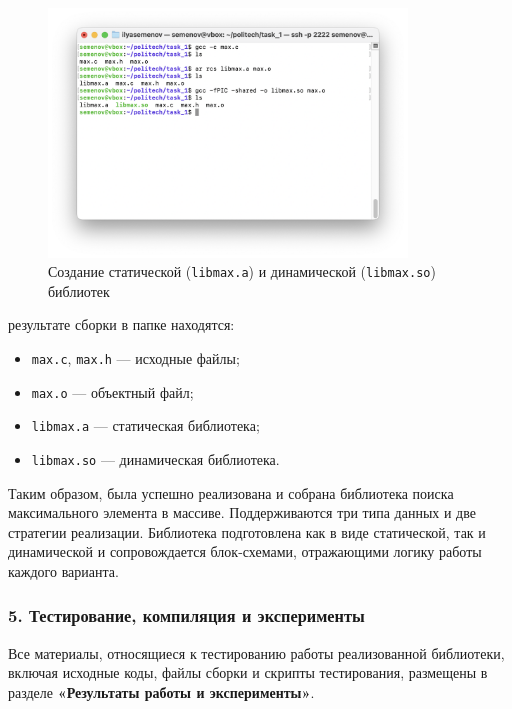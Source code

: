 \begin{figure}[H]
\centering
\includegraphics[width=0.85\textwidth]{img/Screenshot_2025-06-20_at_01.10.14.png}
\caption{Создание статической (\texttt{libmax.a}) и динамической (\texttt{libmax.so}) библиотек}
\end{figure}

 результате сборки в папке находятся:
\begin{itemize}[noitemsep]
  \item \texttt{max.c}, \texttt{max.h} — исходные файлы;
  \item \texttt{max.o} — объектный файл;
  \item \texttt{libmax.a} — статическая библиотека;
  \item \texttt{libmax.so} — динамическая библиотека.
\end{itemize}

Таким образом, была успешно реализована и собрана библиотека поиска максимального элемента в массиве. Поддерживаются три типа данных и две стратегии реализации. Библиотека подготовлена как в виде статической, так и динамической и сопровождается блок-схемами, отражающими логику работы каждого варианта.

\subsubsection*{5. Тестирование, компиляция и эксперименты}

Все материалы, относящиеся к тестированию работы реализованной библиотеки, включая исходные коды, файлы сборки и скрипты тестирования, размещены в разделе \textbf{«Результаты работы и эксперименты»}.

\vspace{.5cm}

